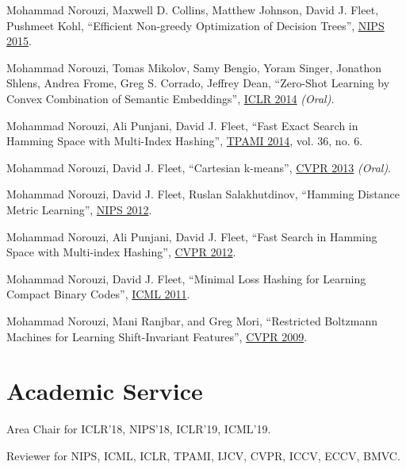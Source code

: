 \documentclass[10pt,letterpaper]{article}
\renewenvironment{itemize}{
  \begin{list}{}{
    \setlength{\leftmargin}{1.5em}
  }
}{
  \end{list}
}
\begin{document}
\begin{itemize}
\item
Mohammad Norouzi, Maxwell D. Collins, Matthew Johnson, David J. Fleet, Pushmeet Kohl,
``Efficient Non-greedy Optimization of Decision Trees'',
\href{http://arxiv.org/pdf/1511.04056}{NIPS 2015}.

\item
Mohammad Norouzi, Tomas Mikolov, Samy Bengio, Yoram Singer, Jonathon Shlens, Andrea Frome, Greg S. Corrado, Jeffrey Dean,
``Zero-Shot Learning by Convex Combination of Semantic Embeddings'',
\href{http://arxiv.org/pdf/1312.5650}{ICLR 2014} {\em (Oral)}.

\item
Mohammad Norouzi, Ali Punjani, David J. Fleet, ``Fast Exact Search in Hamming Space with Multi-Index Hashing'',
\href{https://arxiv.org/pdf/1307.2982}%
{TPAMI 2014}, vol. 36, no. 6.

\item
  Mohammad Norouzi, David J. Fleet, ``Cartesian k-means'',
\href{https://norouzi.github.io/research/papers/ckmeans.pdf}{CVPR 2013} {\em (Oral)}.


\item
  Mohammad Norouzi, David J. Fleet, Ruslan Salakhutdinov,
  ``Hamming Distance Metric Learning'',
  \href{https://norouzi.github.io/research/papers/hdml.pdf}{NIPS 2012}.

\item
  Mohammad Norouzi, Ali Punjani, David J. Fleet,
  ``Fast Search in Hamming Space with Multi-index Hashing'',
  \href{https://norouzi.github.io/research/papers/multi_index_hashing.pdf}{CVPR 2012}.

\item 
  Mohammad Norouzi, David J. Fleet, ``Minimal Loss Hashing for Learning Compact Binary Codes'',
  \href{https://norouzi.github.io/research/papers/min_loss_hash.pdf}{ICML 2011}.

\item 
  Mohammad Norouzi, Mani Ranjbar, and Greg Mori, ``Restricted Boltzmann Machines for Learning Shift-Invariant Features'',
  \href{https://norouzi.github.io/research/papers/conv_rbm.pdf}{CVPR 2009}.
\end{itemize}


\section*{Academic Service}

\begin{itemize}

\item Area Chair for ICLR'18, NIPS'18, ICLR'19, ICML'19.

\item Reviewer for NIPS, ICML, ICLR, TPAMI, IJCV, CVPR, ICCV, ECCV, BMVC.
\end{itemize}
\end{document}
